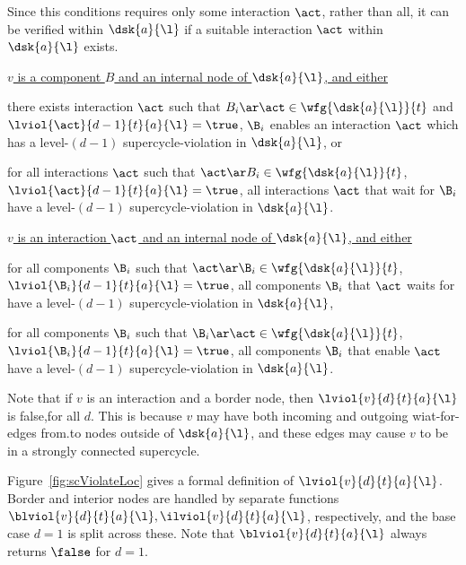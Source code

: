    \ee
Since this conditions requires only some interaction $\act$, rather than all, it can be verified within $\dsk{a}{\l}$ if
a suitable interaction $\act$ within $\dsk{a}{\l}$ exists.



\item \ul{$v$ is a component $B$ and an internal node of $\dsk{a}{\l}$, and either }
   \be

   \item there exists interaction $\act$ such that $B_i \ar \act \in \wfg{\dsk{a}{\l}}{t}$ and $\lviol{\act}{d-1}{t}{a}{\l} = \true$,
         \ie $\B_i$ enables an interaction $\act$ which has a level-$(d-1)$ supercycle-violation in $\dsk{a}{\l}$, or

   \item for all interactions $\act$ such that $\act \ar B_i \in \wfg{\dsk{a}{\l}}{t}$, $\lviol{\act}{d-1}{t}{a}{\l} = \true$,
         \ie all interactions $\act$ that wait for $\B_i$ have a level-$(d-1)$ supercycle-violation in $\dsk{a}{\l}$.

   \ee


\item \ul{$v$ is an interaction $\act$ and an internal node of $\dsk{a}{\l}$, and either}
   \be

   \item for all components $\B_i$ such that $\act \ar \B_i \in \wfg{\dsk{a}{\l}}{t}$, $\lviol{\B_i}{d-1}{t}{a}{\l} = \true$,
         \ie all components $\B_i$ that $\act$ waits for have a level-$(d-1)$ supercycle-violation in $\dsk{a}{\l}$,

   \item for all components $\B_i$ such that $\B_i \ar \act \in \wfg{\dsk{a}{\l}}{t}$, $\lviol{\B_i}{d-1}{t}{a}{\l} = \true$,
         \ie all  components $\B_i$ that enable $\act$ have a level-$(d-1)$ supercycle-violation in $\dsk{a}{\l}$.

   \ee

\ee
Note that if $v$ is an interaction and a border node, then $\lviol{v}{d}{t}{a}{\l}$ is false,for all $d$.   This is
because $v$ may have both incoming and outgoing wiat-for-edges from.to nodes outside of $\dsk{a}{\l}$, and these edges
may cause $v$ to be in a strongly connected supercycle.

Figure~\ref{fig:scViolateLoc} gives a formal definition of $\lviol{v}{d}{t}{a}{\l}$. Border and interior nodes are
handled by separate functions $\blviol{v}{d}{t}{a}{\l}, \ilviol{v}{d}{t}{a}{\l}$, respectively, and the base case $d=1$
is split across these. Note that $\blviol{v}{d}{t}{a}{\l}$ always returns $\false$ for $d=1$.

